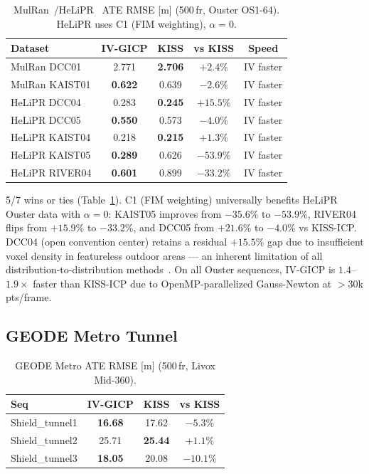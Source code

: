 \documentclass[journal,letterpaper,10pt]{IEEEtran}
\newcommand{\best}[1]{\textbf{#1}}
\begin{document}
\begin{table}[t]
\centering
\caption{MulRan~\cite{kim2020mulran}/HeLiPR~\cite{jung2023helipr}
  ATE RMSE [m] (500\,fr, Ouster OS1-64).
  HeLiPR uses C1 (FIM weighting), $\alpha{=}0$.}
\label{tab:ouster}
\begin{tabular}{lcccc}
\toprule
Dataset & IV-GICP & KISS & vs KISS & Speed \\
\midrule
MulRan DCC01   & 2.771 & \best{2.706} & $+2.4\%$ & IV faster \\
MulRan KAIST01 & \best{0.622} & 0.639 & $-2.6\%$ & IV faster \\
\midrule
HeLiPR DCC04   & 0.283 & \best{0.245} & $+15.5\%$ & IV faster \\
HeLiPR DCC05   & \best{0.550} & 0.573 & $-4.0\%$ & IV faster \\
HeLiPR KAIST04 & 0.218 & \best{0.215} & $+1.3\%$ & IV faster \\
HeLiPR KAIST05 & \best{0.289} & 0.626 & $\mathbf{-53.9\%}$ & IV faster \\
HeLiPR RIVER04 & \best{0.601} & 0.899 & $\mathbf{-33.2\%}$ & IV faster \\
\bottomrule
\end{tabular}
\end{table}

5/7 wins or ties (Table~\ref{tab:ouster}).
C1 (FIM weighting) universally benefits HeLiPR Ouster data with
$\alpha{=}0$: KAIST05 improves from $-35.6\%$ to $\mathbf{-53.9\%}$,
RIVER04 flips from $+15.9\%$ to $\mathbf{-33.2\%}$, and DCC05 from
$+21.6\%$ to $-4.0\%$ vs KISS-ICP. DCC04 (open convention center)
retains a residual $+15.5\%$ gap due to insufficient voxel density
in featureless outdoor areas --- an inherent limitation of
all distribution-to-distribution methods~\cite{segal2009generalized,koide2021voxel}.
On all Ouster sequences, IV-GICP is $1.4$--$1.9\times$ faster than
KISS-ICP due to OpenMP-parallelized Gauss-Newton at $>$30k pts/frame.

\subsection{GEODE Metro Tunnel}\label{sec:metro}

\begin{table}[t]
\centering
\caption{GEODE Metro ATE RMSE [m] (500\,fr, Livox Mid-360).}
\label{tab:metro}
\begin{tabular}{lccc}
\toprule
Seq & IV-GICP & KISS & vs KISS \\
\midrule
Shield\_tunnel1 & \best{16.68} & 17.62 & $-5.3\%$ \\
Shield\_tunnel2 & 25.71 & \best{25.44} & $+1.1\%$ \\
Shield\_tunnel3 & \best{18.05} & 20.08 & $-10.1\%$ \\
\bottomrule
\end{tabular}
\end{table}
\end{document}
